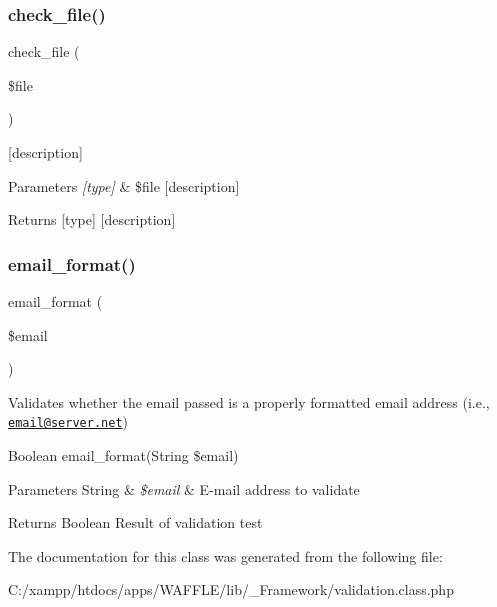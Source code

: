 \subsubsection{\texorpdfstring{check\+\_\+file()}{check\_file()}}
{\footnotesize\ttfamily check\+\_\+file (\begin{DoxyParamCaption}\item[{}]{\$file }\end{DoxyParamCaption})}

\mbox{[}description\mbox{]}


\begin{DoxyParams}{Parameters}
{\em \mbox{[}type\mbox{]}} & \$file \mbox{[}description\mbox{]} \\
\hline
\end{DoxyParams}
\begin{DoxyReturn}{Returns}
\mbox{[}type\mbox{]} \mbox{[}description\mbox{]} 
\end{DoxyReturn}
\mbox{\label{class_w_a_f_f_l_e_1_1_framework_1_1_i_o_1_1_validation_a93629f2b411f25d13fac77a36470fbae}} 
\subsubsection{\texorpdfstring{email\+\_\+format()}{email\_format()}}
{\footnotesize\ttfamily email\+\_\+format (\begin{DoxyParamCaption}\item[{}]{\$email }\end{DoxyParamCaption})}

Validates whether the email passed is a properly formatted email address (i.\+e., \href{mailto:email@server.net}{\tt email@server.\+net})

Boolean email\+\_\+format(String \$email)


\begin{DoxyParams}[1]{Parameters}
String & {\em \$email} & E-\/mail address to validate \\
\hline
\end{DoxyParams}
\begin{DoxyReturn}{Returns}
Boolean Result of validation test 
\end{DoxyReturn}


The documentation for this class was generated from the following file\+:\begin{DoxyCompactItemize}
\item 
C\+:/xampp/htdocs/apps/\+W\+A\+F\+F\+L\+E/lib/\+\_\+\+Framework/validation.\+class.\+php\end{DoxyCompactItemize}
